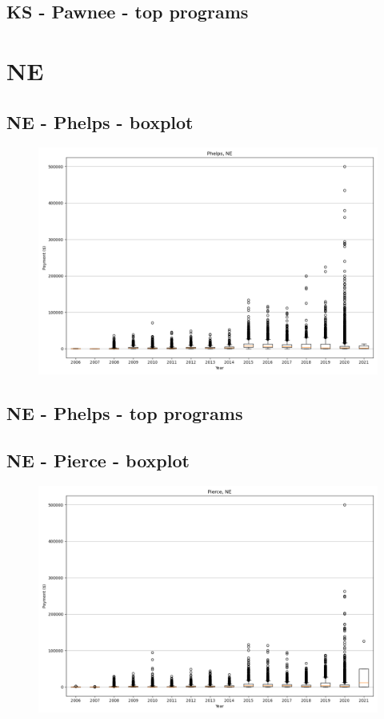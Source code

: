 \subsection*{KS - Pawnee - top programs}

\newpage
\section*{NE}
\subsection*{NE - Phelps - boxplot}
\begin{figure}[h]
\centering
\includegraphics[width=7in]{../output/boxplots/counties/Phelps-NE_boxplot.png}
\end{figure}


\subsection*{NE - Phelps - top programs}

\newpage
\subsection*{NE - Pierce - boxplot}
\begin{figure}[h]
\centering
\includegraphics[width=7in]{../output/boxplots/counties/Pierce-NE_boxplot.png}
\end{figure}


